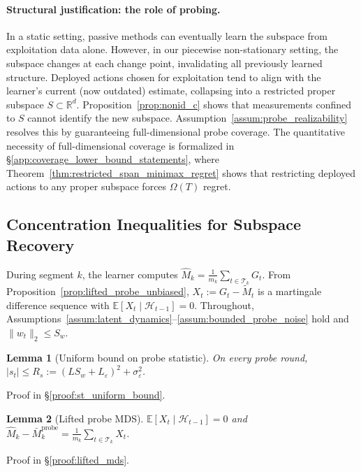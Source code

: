 \documentclass{article}
\newcommand{\R}{\mathbb{R}}
\newcommand{\E}{\mathbb{E}}
\newcommand{\cH}{\mathcal{H}}
\newcommand{\cT}{\mathcal{T}}
\newtheorem{lemma}{Lemma}
\begin{document}
\paragraph{Structural justification: the role of probing.}
In a static setting, passive methods can eventually learn the subspace from exploitation data alone.
However, in our piecewise non-stationary setting, the subspace changes at each change point, invalidating all previously learned structure.
Deployed actions chosen for exploitation tend to align with the learner's current (now outdated) estimate, collapsing into a restricted proper subspace $S \subset \R^d$.
Proposition~\ref{prop:nonid_c} shows that measurements confined to $S$ cannot identify the new subspace.
Assumption~\ref{assum:probe_realizability} resolves this by guaranteeing full-dimensional probe coverage.
The quantitative necessity of full-dimensional coverage is formalized in \S\ref{app:coverage_lower_bound_statements}, where Theorem~\ref{thm:restricted_span_minimax_regret} shows that restricting deployed actions to any proper subspace forces $\Omega(T)$ regret.

\subsection{Concentration Inequalities for Subspace Recovery}
\label{app:concentration}

During segment $k$, the learner computes $\widehat{M}_k = \frac{1}{m_k} \sum_{t \in \cT_k} G_t$.
From Proposition~\ref{prop:lifted_probe_unbiased}, $X_t := G_t - \widetilde{M}_t$ is a martingale difference sequence with $\E[X_t \mid \cH_{t-1}] = 0$.
Throughout, Assumptions~\ref{assum:latent_dynamics}--\ref{assum:bounded_probe_noise} hold and $\|w_t\|_2 \le S_w$.

\begin{lemma}[Uniform bound on probe statistic]
\label{lem:st_uniform_bound}
On every probe round, $|s_t| \le R_s := (LS_w + L_\varepsilon)^2 + \sigma_\varepsilon^2$.
\end{lemma}

Proof in \S\ref{proof:st_uniform_bound}.

\begin{lemma}[Lifted probe MDS]
\label{lem:lifted_mds}
$\E[X_t \mid \cH_{t-1}] = 0$ and $\widehat{M}_k - \bar{M}_k^{\mathrm{probe}} = \frac{1}{m_k}\sum_{t \in \cT_k} X_t$.
\end{lemma}

Proof in \S\ref{proof:lifted_mds}.
\end{document}

